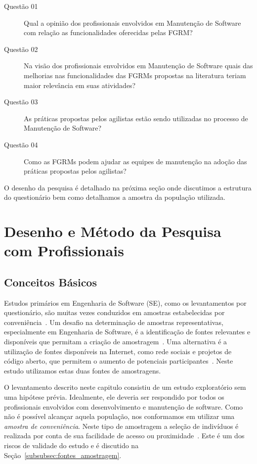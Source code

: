 \begin{description}
	\item[Questão 01] Qual a opinião dos profissionais envolvidos em Manutenção
		de Software com relação as funcionalidades oferecidas pelas
		FGRM\@?
	\item[Questão 02] Na visão dos profissionais envolvidos em Manutenção de
        Software quais das melhorias nas funcionalidades das FGRMs propostas na
        literatura teriam maior relevância em suas atividades?
	\item[Questão 03] As práticas propostas pelos agilistas estão sendo
        utilizadas no processo de Manutenção de Software?
    \item[Questão 04] Como as FGRMs podem ajudar as equipes de manutenção na
        adoção das práticas propostas pelos agilistas?
\end{description}

O desenho da pesquisa é detalhado na próxima seção onde discutimos a estrutura
do questionário bem como detalhamos a amostra da população utilizada.

\section{Desenho e Método da Pesquisa com Profissionais}
\label{sec:desenho_da_pesquisa_com_profissionais}

\subsection{Conceitos Básicos}

Estudos primários em Engenharia de Software (SE), como os levantamentos por
questionário, são muitas vezes conduzidos em amostras estabelecidas por
conveniência~\cite{sjoberg2005survey, dybaa2006systematic}. Um desafio na
determinação de amostras representativas, especialmente em Engenharia de
Software, é a identificação de fontes relevantes e disponíveis que permitam a
criação de amostragem~\cite{de2014towards}. Uma alternativa é a utilização de
fontes disponíveis na Internet, como rede sociais e projetos de código aberto,
que permitem o aumento de potenciais participantes~\cite{de2013would}. Neste
estudo utilizamos estas duas fontes de amostragens.

O levantamento descrito neste capitulo consistiu de um estudo exploratório sem
uma hipótese prévia. Idealmente, ele deveria ser respondido por todos os
profissionais envolvidos com desenvolvimento e manutenção de software. Como não
é possível alcançar aquela população, nos conformamos em utilizar uma
\textit{amostra de conveniência}. Neste tipo de amostragem a seleção de
indivíduos é realizada por conta de sua facilidade de acesso ou
proximidade~\cite{marshall1996sampling}. Este é um dos riscos de validade do
estudo e é discutido na Seção~\ref{subsubsec:fontes_amostragem}.

